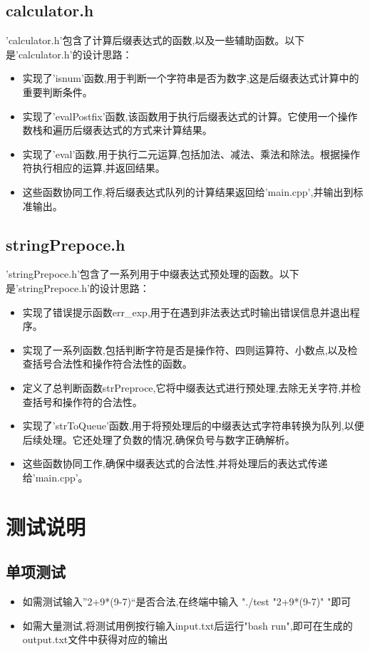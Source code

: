 \documentclass[12pt, a4paper, oneside]{ctexart}
\begin{document}
\subsection{calculator.h}
'calculator.h'包含了计算后缀表达式的函数,以及一些辅助函数。以下是'calculator.h'的设计思路：

\begin{itemize}
\item 实现了'isnum'函数,用于判断一个字符串是否为数字,这是后缀表达式计算中的重要判断条件。

\item 实现了'evalPostfix'函数,该函数用于执行后缀表达式的计算。它使用一个操作数栈和遍历后缀表达式的方式来计算结果。

\item 实现了'eval'函数,用于执行二元运算,包括加法、减法、乘法和除法。根据操作符执行相应的运算,并返回结果。

\item 这些函数协同工作,将后缀表达式队列的计算结果返回给'main.cpp',并输出到标准输出。

\end{itemize}

\subsection{stringPrepoce.h}
'stringPrepoce.h'包含了一系列用于中缀表达式预处理的函数。以下是'stringPrepoce.h'的设计思路：

\begin{itemize}
\item 实现了错误提示函数err\_exp,用于在遇到非法表达式时输出错误信息并退出程序。

\item 实现了一系列函数,包括判断字符是否是操作符、四则运算符、小数点,以及检查括号合法性和操作符合法性的函数。

\item 定义了总判断函数strPreproce,它将中缀表达式进行预处理,去除无关字符,并检查括号和操作符的合法性。

\item 实现了'strToQueue'函数,用于将预处理后的中缀表达式字符串转换为队列,以便后续处理。它还处理了负数的情况,确保负号与数字正确解析。

\item 这些函数协同工作,确保中缀表达式的合法性,并将处理后的表达式传递给'main.cpp'。

\end{itemize}

\section{测试说明}

\subsection{单项测试}

\begin{itemize}

\item 如需测试输入”2+9*(9-7)“是否合法,在终端中输入 "./test "2+9*(9-7)" "即可

\item 如需大量测试,将测试用例按行输入input.txt后运行"bash run",即可在生成的output.txt文件中获得对应的输出

\end{itemize}
\end{document}
